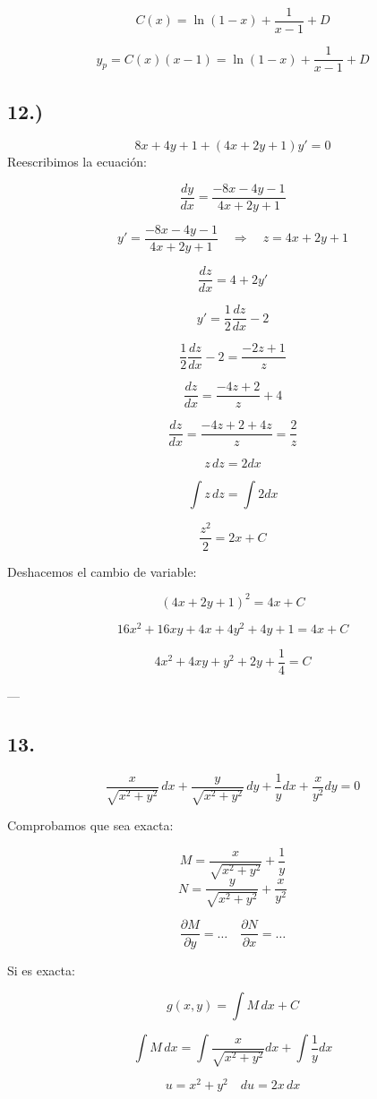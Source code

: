 \documentclass[a4paper,12pt]{article}
\begin{document}
\[
C(x) = \ln(1 - x) + \frac{1}{x - 1} + D
\]

\[
y_p = C(x)(x - 1) = \ln(1 - x) + \frac{1}{x - 1} + D
\]
\newpage
\noindent
\subsection*{12.)}
\[
8x + 4y + 1 + (4x + 2y + 1)y' = 0
\]
Reescribimos la ecuación:

\[
\frac{dy}{dx} = \frac{-8x - 4y - 1}{4x + 2y + 1}
\]

\[
y' = \frac{-8x - 4y - 1}{4x + 2y + 1} \quad \Rightarrow \quad z = 4x + 2y + 1
\]

\[
\frac{dz}{dx} = 4 + 2y'
\]

\[
y' = \frac{1}{2} \frac{dz}{dx} - 2
\]

\[
\frac{1}{2}\frac{dz}{dx} - 2 = \frac{-2z + 1}{z}
\]

\[
\frac{dz}{dx} = \frac{-4z + 2}{z} + 4
\]

\[
\frac{dz}{dx} = \frac{-4z + 2 + 4z}{z} = \frac{2}{z}
\]

\[
z\, dz = 2 dx
\]

\[
\int z\, dz = \int 2 dx
\]

\[
\frac{z^2}{2} = 2x + C
\]

Deshacemos el cambio de variable:

\[
(4x + 2y + 1)^2 = 4x + C
\]

\[
16x^2 + 16xy + 4x + 4y^2 + 4y + 1 = 4x + C
\]

\[
4x^2 + 4xy + y^2 + 2y + \frac{1}{4} = C
\]

---

\subsection*{13.}
\[
\frac{x}{\sqrt{x^2 + y^2}}\, dx + \frac{y}{\sqrt{x^2 + y^2}}\, dy + \frac{1}{y} dx + \frac{x}{y^2} dy = 0
\]

Comprobamos que sea exacta:

\[
M = \frac{x}{\sqrt{x^2 + y^2}} + \frac{1}{y}
\]
\[
N = \frac{y}{\sqrt{x^2 + y^2}} + \frac{x}{y^2}
\]

\[
\frac{\partial M}{\partial y} = \dots \quad \frac{\partial N}{\partial x} = \dots
\]

Si es exacta:

\[
g(x,y) = \int M\, dx + C
\]

\[
\int M\, dx = \int \frac{x}{\sqrt{x^2 + y^2}} dx + \int \frac{1}{y} dx
\]

\[
u = x^2 + y^2 \quad du = 2x\, dx
\]
\end{document}
